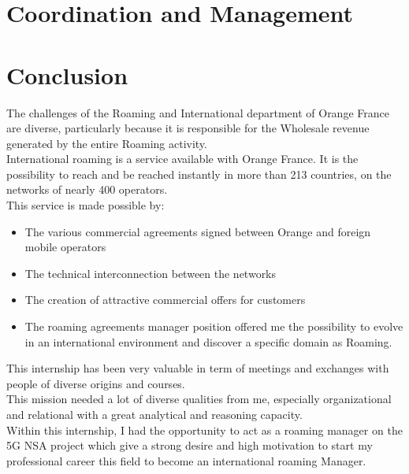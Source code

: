 \documentclass[12pt,a4paper,onecolumn,openright,oneside]{report}
\begin{document}
	\chapter{Coordination and Management}
		

	\chapter*{Conclusion}
	\-\hspace{0.5cm} The challenges of the Roaming and International department of Orange France are diverse, particularly because it is responsible for the Wholesale revenue generated by the entire Roaming activity.\\

	International roaming is a service available with Orange France. It is the possibility to reach and be reached instantly in more than 213 countries, on the networks of nearly 400 operators.\\

	This service is made possible by:

	\begin{itemize}
		\item The various commercial agreements signed between Orange and foreign mobile operators
		\item The technical interconnection between the networks
		\item The creation of attractive commercial offers for customers
		\item The roaming agreements manager position offered me the possibility to evolve in an international environment and discover a specific domain as Roaming.
	\end{itemize}

	This internship has been very valuable in term of meetings and exchanges with people of diverse origins and courses.\\

	This mission needed a lot of diverse qualities from me, especially organizational and relational with a great analytical and reasoning capacity. \\

	Within this internship, I had the opportunity to act as a roaming manager on the 5G NSA project which give a strong desire and high motivation to start my professional career this field to become an international roaming Manager.
\end{document}
